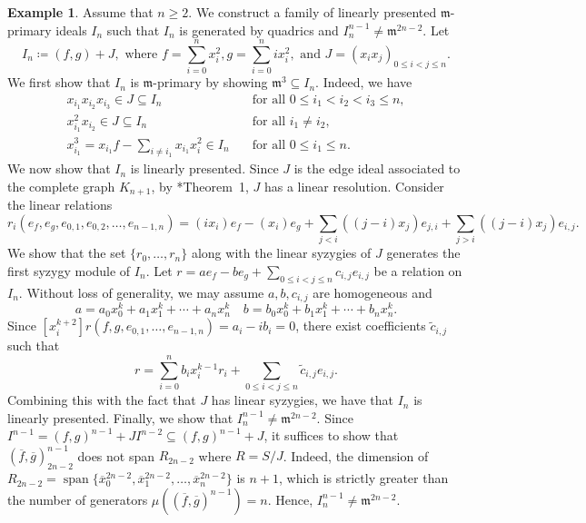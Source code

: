 \documentclass[11pt,letterpaper,reqno]{amsart}
\newcommand{\m}{\mathfrak{m}}
\theoremstyle{definition}
\newtheorem{example}[theorem]{Example}
\numberwithin{equation}{section}
\begin{document}
\begin{example}\label{ex:sharp=2}
    Assume that $n \ge 2$. We construct a family of linearly presented $\m$-primary ideals $I_n$ such that $I_n$ is generated by quadrics and $I_n^{n-1} \ne \m^{2n-2}$. Let
    \[I_n \coloneqq (f,g) + J, \text{ where }f=\sum_{i = 0}^n x_i^2, g = \sum_{i = 0}^n ix_i^2,\text{ and }J = (x_i x_j)_{0 \le i < j \le n}.\]
    We first show that $I_n$ is $\m$-primary by showing $\m^3 \subseteq I_n$. Indeed, we have
    \begin{align*}
        x_{i_1}x_{i_2}x_{i_3} \in J \subseteq I_n &\quad\text{for all }0 \le i_1 < i_2 < i_3 \le n,\\
        x_{i_1}^2x_{i_2} \in J \subseteq I_n &\quad\text{for all } i_1\ne i_2,\\ 
        x_{i_1}^3 = x_{i_1}f - \sum_{i\ne i_1}x_{i_1}x_{i}^2 \in I_n &\quad\text{for all }0\le i_1\le n.
    \end{align*}
    We now show that $I_n$ is linearly presented. Since $J$ is the edge ideal associated to the complete graph $K_{n+1}$, by \cite{Froberg}*{Theorem~1}, $J$ has a linear resolution. Consider the linear relations
    \[r_{i}(e_f,e_g,e_{0,1},e_{0,2},\dots,e_{n-1,n}) = (ix_i) e_f - (x_i)e_g + \sum_{j<i}((j-i)x_j) e_{j,i} + \sum_{j>i}((j-i)x_j) e_{i,j}.\]
    We show that the set $\{r_0,\dots,r_n\}$ along with the linear syzygies of $J$ generates the first syzygy module of $I_n$. Let $r = ae_f - be_g + \sum_{0 \le i < j \le n}c_{i,j}e_{i,j}$ be a relation on $I_n$. Without loss of generality, we may assume $a,b,c_{i,j}$ are homogeneous and 
    \[a = a_0x^k_0 + a_1x^k_1 + \cdots + a_n x_n^k \quad b = b_0 x_0^k + b_1x_1^k + \cdots + b_n x_n^k.\]
    Since $[x_i^{k+2}] r(f,g,e_{0,1},\dots,e_{n-1,n}) = a_i - ib_i = 0$, there exist coefficients $\widetilde{c}_{i,j}$ such that
    \[r = \sum_{i = 0}^n b_ix_i^{k-1}r_i + \sum_{0 \le i < j \le n} \widetilde{c}_{i,j}e_{i,j}.\]
    Combining this with the fact that $J$ has linear syzygies, we have that $I_n$ is linearly presented. Finally, we show that $I_n^{n-1} \ne \m^{2n-2}$. Since $I^{n-1} = (f,g)^{n-1} + J I^{n-2} \subseteq (f,g)^{n-1} + J$, it suffices to show that $(\overline{f},\overline{g})^{n-1}_{2n-2}$ does not span $R_{2n-2}$ where $R = S/J$. Indeed, the dimension of $R_{2n-2} = \operatorname{span}\{\overline{x}_0^{2n-2},\overline{x}_1^{2n-2},\dots,\overline{x}_n^{2n-2}\}$ is $n+1$, which is strictly greater than the number of generators $\mu((\overline{f},\overline{g})^{n-1}) = n$. Hence, $I_n^{n-1} \ne \m^{2n-2}$.
\end{example}
\end{document}
